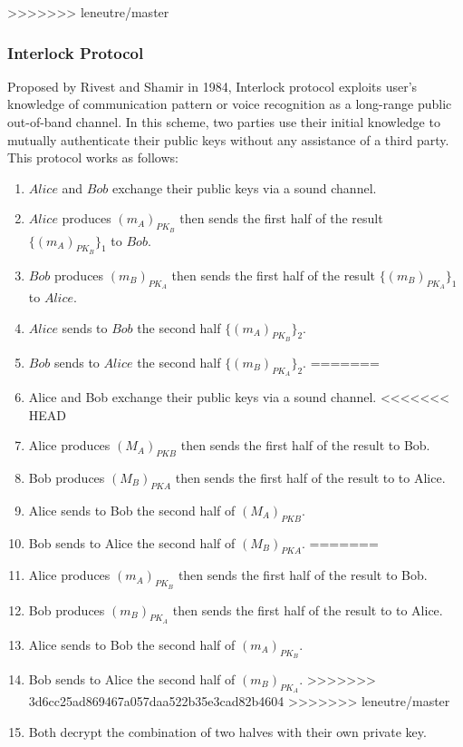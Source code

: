 >>>>>>> leneutre/master
\subsubsection{Interlock Protocol}

Proposed by Rivest and Shamir in 1984, Interlock protocol exploits user's knowledge of communication pattern or voice recognition as a long-range public out-of-band channel. In this scheme, two parties use their initial knowledge to mutually authenticate their public keys without any assistance of a third party. This protocol works as follows:
\begin{enumerate}
<<<<<<< HEAD
\item $Alice$ and $Bob$ exchange their public keys via a sound channel. 
\item $Alice$ produces $(m_A)_{PK_B}$ then sends the first half of the result  $\{(m_A)_{PK_B}\}_1$ to $Bob$. 
\item $Bob$ produces $(m_B)_{PK_A}$ then sends the first half of the result $\{(m_B)_{PK_A}\}_1$ to $Alice$. 
\item $Alice$ sends to $Bob$ the second half $\{(m_A)_{PK_B}\}_2$. 
\item $Bob$ sends to $Alice$ the second half $\{(m_B)_{PK_A}\}_2$. 
=======
\item Alice and Bob exchange their public keys via a sound channel. 
<<<<<<< HEAD
\item Alice produces $(M_A)_{PKB}$ then sends the first half of the result to Bob. 
\item Bob produces $(M_B)_{PKA}$ then sends the first half of the result to to Alice. 
\item Alice sends to Bob the second half of $(M_A)_{PKB}$. 
\item Bob sends to Alice the second half of $(M_B)_{PKA}$. 
=======
\item Alice produces $(m_A)_{PK_B}$ then sends the first half of the result to Bob. 
\item Bob produces $(m_B)_{PK_A}$ then sends the first half of the result to to Alice. 
\item Alice sends to Bob the second half of $(m_A)_{PK_B}$. 
\item Bob sends to Alice the second half of $(m_B)_{PK_A}$. 
>>>>>>> 3d6cc25ad869467a057daa522b35e3cad82b4604
>>>>>>> leneutre/master
\item Both decrypt the combination of two halves with their own private key. 
\end{enumerate}   

